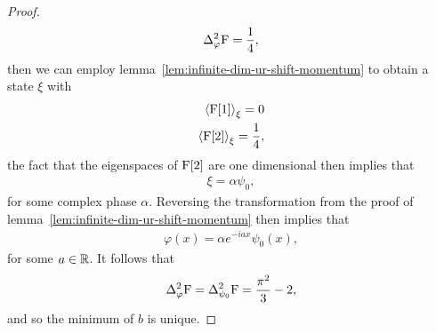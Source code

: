 \begin{proof}
\begin{align}
  \var[\varphi]{\opf} = \frac{1}{4},
\end{align}
then we can employ lemma~\ref{lem:infinite-dim-ur-shift-momentum} to obtain a state $\xi$ with
\begin{align}
  \left\langle{\operatorname{F}[1]}\right\rangle_{\xi} = 0\\
  \left\langle{\operatorname{F}[2]}\right\rangle_{\xi} = \frac{1}{4},
\end{align}
the fact that the eigenspaces of $\operatorname{F}[2]$ are one dimensional then implies that 
\begin{align}
  \xi = \alpha \psi_0,
\end{align}
for some complex phase $\alpha$. Reversing the transformation from the proof of lemma~\ref{lem:infinite-dim-ur-shift-momentum} then implies that
\begin{align}
  \varphi(x) = \alpha e^{-iax}\psi_0(x),
\end{align}
for some $a\in\mathbb{R}$. It follows that 
\begin{align}
  \var[\varphi]{\opf} = \var[\psi_0]{\opf} = \frac{\pi^2}{3}-2,
\end{align}
and so the minimum of $b$ is unique.
\end{proof}

